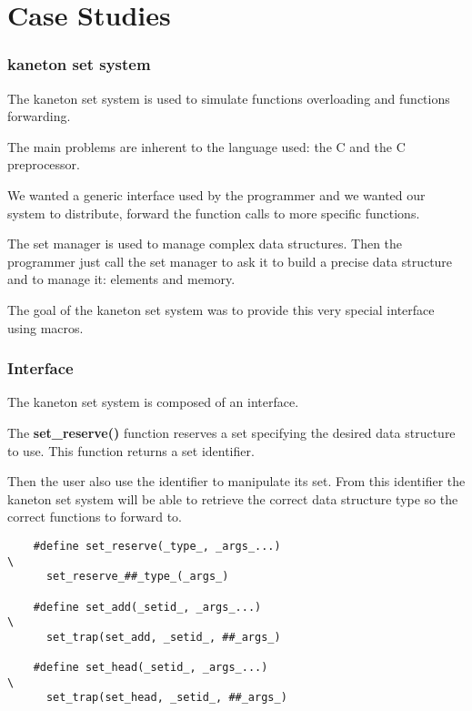 \documentclass[8pt]{beamer}
\newcommand{\nl}[0]{\vspace{0.4cm}}
\begin{document}
%
%

\section{Case Studies}


\begin{frame}
  \frametitle{kaneton set system}

  The kaneton set system is used to simulate functions overloading and
  functions forwarding.

  \nl

  The main problems are inherent to the language used: the C and the C
  preprocessor.

  \nl

  We wanted a generic interface used by the programmer and we wanted our
  system to distribute, forward the function calls to more specific
  functions.

  \nl

  The set manager is used to manage complex data structures. Then the
  programmer just call the set manager to ask it to build a precise data
  structure and to manage it: elements and memory.

  \nl

  The goal of the kaneton set system was to provide this very special
  interface using macros.
\end{frame}


\begin{frame}[containsverbatim]
  \frametitle{Interface}

  The kaneton set system is composed of an interface.

  \nl

  The \textbf{set\_reserve()} function reserves a set specifying the desired
  data structure to use. This function returns a set identifier.

  \nl

  Then the user also use the identifier to manipulate its set. From this
  identifier the kaneton set system will be able to retrieve the correct
  data structure type so the correct functions to forward to.

  \begin{verbatim}
    #define set_reserve(_type_, _args_...)                                  \
      set_reserve_##_type_(_args_)

    #define set_add(_setid_, _args_...)                                     \
      set_trap(set_add, _setid_, ##_args_)

    #define set_head(_setid_, _args_...)                                    \
      set_trap(set_head, _setid_, ##_args_)
  \end{verbatim}
\end{frame}
\end{document}
